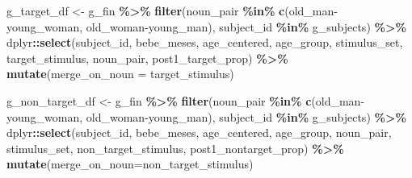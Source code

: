 \documentclass[
  doc,floatsintext]{apa6}
\newenvironment{Shaded}{\begin{snugshade}}{\end{snugshade}}
\newcommand{\AttributeTok}[1]{\textcolor[rgb]{0.13,0.29,0.53}{#1}}
\newcommand{\FunctionTok}[1]{\textcolor[rgb]{0.13,0.29,0.53}{\textbf{#1}}}
\newcommand{\NormalTok}[1]{#1}
\newcommand{\OtherTok}[1]{\textcolor[rgb]{0.56,0.35,0.01}{#1}}
\newcommand{\SpecialCharTok}[1]{\textcolor[rgb]{0.81,0.36,0.00}{\textbf{#1}}}
\newcommand{\StringTok}[1]{\textcolor[rgb]{0.31,0.60,0.02}{#1}}
\begin{document}
\begin{Shaded}
\begin{Highlighting}[]
\NormalTok{g\_target\_df }\OtherTok{\textless{}{-}}\NormalTok{ g\_fin }\SpecialCharTok{\%\textgreater{}\%}
  \FunctionTok{filter}\NormalTok{(noun\_pair }\SpecialCharTok{\%in\%} \FunctionTok{c}\NormalTok{(}\StringTok{\textquotesingle{}old\_man{-}young\_woman\textquotesingle{}}\NormalTok{, }\StringTok{\textquotesingle{}old\_woman{-}young\_man\textquotesingle{}}\NormalTok{),}
\NormalTok{         subject\_id }\SpecialCharTok{\%in\%}\NormalTok{ g\_subjects) }\SpecialCharTok{\%\textgreater{}\%}
\NormalTok{  dplyr}\SpecialCharTok{::}\FunctionTok{select}\NormalTok{(subject\_id, }
\NormalTok{                bebe\_meses,}
\NormalTok{                age\_centered,}
\NormalTok{                age\_group,}
\NormalTok{                stimulus\_set, }
\NormalTok{                target\_stimulus, }
\NormalTok{                noun\_pair, }
\NormalTok{                post1\_target\_prop) }\SpecialCharTok{\%\textgreater{}\%}
  \FunctionTok{mutate}\NormalTok{(}\AttributeTok{merge\_on\_noun =}\NormalTok{ target\_stimulus)}

\NormalTok{g\_non\_target\_df }\OtherTok{\textless{}{-}}\NormalTok{ g\_fin }\SpecialCharTok{\%\textgreater{}\%}
  \FunctionTok{filter}\NormalTok{(noun\_pair }\SpecialCharTok{\%in\%} \FunctionTok{c}\NormalTok{(}\StringTok{\textquotesingle{}old\_man{-}young\_woman\textquotesingle{}}\NormalTok{, }\StringTok{\textquotesingle{}old\_woman{-}young\_man\textquotesingle{}}\NormalTok{),}
\NormalTok{                          subject\_id }\SpecialCharTok{\%in\%}\NormalTok{ g\_subjects) }\SpecialCharTok{\%\textgreater{}\%}
\NormalTok{  dplyr}\SpecialCharTok{::}\FunctionTok{select}\NormalTok{(subject\_id, }
\NormalTok{                bebe\_meses,}
\NormalTok{                age\_centered,}
\NormalTok{                age\_group,}
\NormalTok{                noun\_pair,}
\NormalTok{                stimulus\_set, }
\NormalTok{                non\_target\_stimulus,}
\NormalTok{                post1\_nontarget\_prop) }\SpecialCharTok{\%\textgreater{}\%}
  \FunctionTok{mutate}\NormalTok{(}\AttributeTok{merge\_on\_noun=}\NormalTok{non\_target\_stimulus)}


\end{Highlighting}
\end{Shaded}
\end{document}
